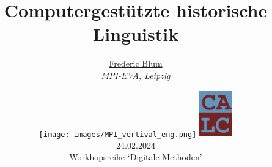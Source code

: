 \title[Digitale Methoden]
{Computergestützte historische Linguistik}

\author[Frederic Blum]
    {%
           \texorpdfstring{\Large
					\centering
					\href{mailto:frederic_blum@eva.mpg.de.de}{Frederic Blum} \\
					\textit{\small{MPI-EVA, Leipzig}}
				\vspace*{-0.5cm}
        }
       {Blum}
}

\date{\hspace*{-1cm}
	\texttt{[image: images/MPI\_vertival\_eng.png]} \hspace*{0.5cm}
	\includegraphics[height=2cm]{images/title_calc.jpg} \vspace*{0.5cm}\\
	24.02.2024  \\ \footnotesize Workhopsreihe `Digitale Methoden'
	}